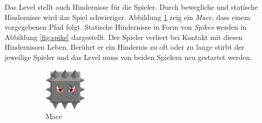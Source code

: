 Das Level stellt auch Hindernisse für die Spieler. Durch bewegliche und statische Hindernisse wird das Spiel schwieriger. Abbildung \ref{fig:mace} zeig ein \textit{Mace}, dass einem vorgegebenen Pfad folgt. Statische Hindernisse in Form von \textit{Spikes} werden in Abbildung \ref{fig:spike} dargestellt. Der Spieler verliert bei Kontakt mit diesen Hindernissen Leben. Berührt er ein Hindernis zu oft oder zu lange stirbt der jeweilige Spieler und das Level muss von beiden Spielern neu gestartet werden.

\begin{figure}[H]
    \centering
    \begin{subfigure}[H]{0.15\textwidth}
        \includegraphics[width=\textwidth]{img/realisierung/assets/mace}
        \caption{Mace}
        \label{fig:mace}
    \end{subfigure}
    \qquad
    \begin{subfigure}[H]{0.15\textwidth}

\end{subfigure}
\end{figure}
